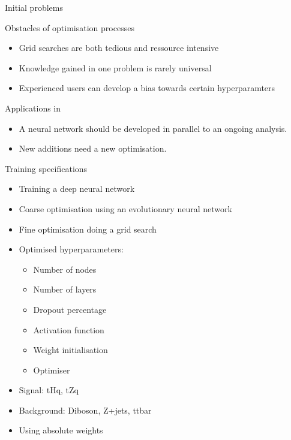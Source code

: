 \begin{frame}{Initial problems}
    \begin{block}{Obstacles of optimisation processes}
        \begin{itemize}
            \item Grid searches are both tedious and ressource intensive
            \item Knowledge gained in one problem is rarely universal
            \item Experienced users can develop a bias towards certain hyperparamters
        \end{itemize}
    \end{block}
    \begin{block}{Applications in}
        \begin{itemize}
            \item A neural network should be developed in parallel to an ongoing analysis.
            \item New additions need a new optimisation.
        \end{itemize}
    \end{block}
\end{frame}

\begin{frame}{Training specifications}
  \begin{itemize}
      \item Training a deep neural network
      \vspace{0.2cm}
      \item Coarse optimisation using an evolutionary neural network
      \vspace{0.2cm}
      \item Fine optimisation doing a grid search
      \vspace{0.2cm}
      \item Optimised hyperparameters:
          \begin{itemize}
              \item Number of nodes
              \item Number of layers
              \item Dropout percentage
              \item Activation function
              \item Weight initialisation
              \item Optimiser
          \end{itemize}
      \item Signal: tHq, tZq
      \item Background: Diboson, Z+jets, ttbar
      \item Using absolute weights
  \end{itemize}
\end{frame}


